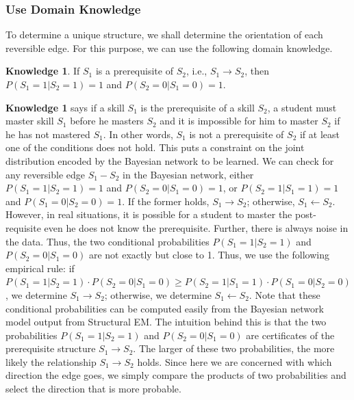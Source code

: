 \documentclass{edm_template}
\begin{document}
\subsubsection{Use Domain Knowledge}
\label{sec:usedomain}
To determine a unique structure, we shall determine the orientation of each reversible edge.
For this purpose, we can use the following domain knowledge.

\textbf{Knowledge 1}. If $S_1$ is a prerequisite of $S_2$, i.e., $S_1\rightarrow S_2$, then $P(S_1=1|S_2=1)= 1$ and $P(S_2=0|S_1=0)= 1$.

\textbf{Knowledge 1} says if a skill $S_1$ is the prerequisite of a skill $S_2$,
a student must master skill $S_1$ before he masters $S_2$ and it is impossible for him to master $S_2$ if he has not mastered $S_1$.
In other words, $S_1$ is not a prerequisite of $S_2$ if at least one of the conditions does not hold.
This puts a constraint on the joint distribution encoded by the Bayesian network to be learned.
We can check for any reversible edge $S_1-S_2$ in the Bayesian network, either $P(S_1=1|S_2=1)= 1$ and $P(S_2=0|S_1=0)= 1$, or $P(S_2=1|S_1=1)= 1$ and $P(S_1=0|S_2=0)= 1$. 
If the former holds, $S_1\rightarrow S_2$; otherwise, $S_1\leftarrow S_2$.  
However, in real situations, it is possible for a student to master the post-requisite even he does not know the prerequisite. 
Further, there is always noise in the data. Thus, the two conditional probabilities $P(S_1=1|S_2=1)$ and $P(S_2=0|S_1=0)$ are not exactly but close to 1.
Thus, we use the following empirical rule: if $P(S_1=1|S_2=1)\cdot P(S_2=0|S_1=0)\ge P(S_2=1|S_1=1)\cdot P(S_1=0|S_2=0)$, we determine $S_1\rightarrow S_2$; 
otherwise, we determine $S_1\leftarrow S_2$.
Note that these conditional probabilities can be computed easily from the Bayesian network model output from Structural EM. 
The intuition behind this is that the two probabilities $P(S_1=1|S_2=1)$ and $P(S_2=0|S_1=0)$ are certificates of the prerequisite structure $S_1\rightarrow S_2$.
The larger of these two probabilities, the more likely the relationship $S_1\rightarrow S_2$ holds.
Since here we are concerned with which direction the edge goes, we simply compare the products of two probabilities and select the direction that is more probable. 
\end{document}
